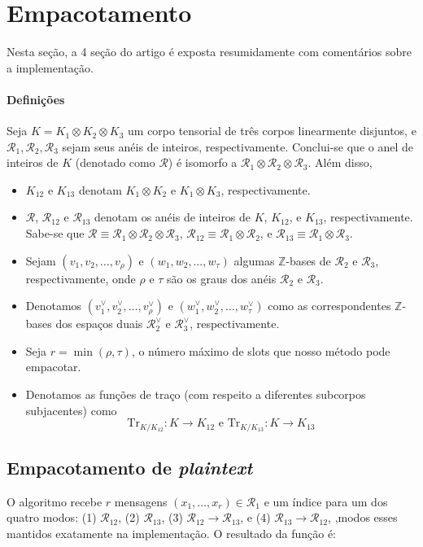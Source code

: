 \section{Empacotamento}
Nesta seção, a 4 seção do artigo \cite{lw23I} é exposta resumidamente com comentários sobre a implementação.  

\paragraph{Definições} Seja $K = K_1 \otimes K_2 \otimes K_3$ um corpo tensorial de três corpos linearmente disjuntos, e $\mathcal{R}_1, \mathcal{R}_2, \mathcal{R}_3$ sejam seus anéis de inteiros, respectivamente. Conclui-se que o anel de inteiros de $K$ (denotado como $\mathcal{R}$) é isomorfo a $\mathcal{R}_1 \otimes \mathcal{R}_2 \otimes \mathcal{R}_3$. Além disso, 

\begin{itemize}
    \item $K_{12}$ e $K_{13}$ denotam $K_1 \otimes K_2$ e $K_1 \otimes K_3$, respectivamente.
    \item $\mathcal{R}$, $\mathcal{R}_{12}$ e $\mathcal{R}_{13}$ denotam os anéis de inteiros de $K$, $K_{12}$, e $K_{13}$, respectivamente. Sabe-se que $\mathcal{R} \equiv \mathcal{R}_1 \otimes \mathcal{R}_2 \otimes \mathcal{R}_3$, $\mathcal{R}_{12} \equiv \mathcal{R}_1 \otimes \mathcal{R}_2$, e $\mathcal{R}_{13} \equiv \mathcal{R}_1 \otimes \mathcal{R}_3$.
    \item Sejam $(v_1, v_2, \ldots, v_\rho)$ e $(w_1, w_2, \ldots, w_\tau)$ algumas $\mathbb{Z}$-bases de $\mathcal{R}_2$ e $\mathcal{R}_3$, respectivamente, onde $\rho$ e $\tau$ são os graus dos anéis $\mathcal{R}_2$ e $\mathcal{R}_3$.
    \item Denotamos $(v_1^\vee, v_2^\vee, \ldots, v_\rho^\vee)$ e $(w_1^\vee, w_2^\vee, \ldots, w_\tau^\vee)$ como as correspondentes $\mathbb{Z}$-bases dos espaços duais $\mathcal{R}_2^\vee$ e $\mathcal{R}_3^\vee$, respectivamente.
    \item Seja $r = \min(\rho, \tau)$, o número máximo de slots que nosso método pode empacotar.
    \item Denotamos as funções de traço (com respeito a diferentes subcorpos subjacentes) como
    \[ \mathrm{Tr}_{K/K_{12}}: K \rightarrow K_{12} \text{ e } \mathrm{Tr}_{K/K_{13}}: K \rightarrow K_{13} \]
\end{itemize}

\subsection{Empacotamento de \textit{plaintext}}
 O algoritmo recebe $r$ mensagens $(x_1, \ldots, x_r) \in \mathcal{R}_1$ e um índice para um dos quatro modos: (1) $\mathcal{R}_{12}$, (2) $\mathcal{R}_{13}$, 
 (3) $\mathcal{R}_{12} \rightarrow \mathcal{R}_{13}$, e (4) $\mathcal{R}_{13} \rightarrow \mathcal{R}_{12}$, ,modos esses mantidos exatamente
 na implementação. O resultado da função é: 

